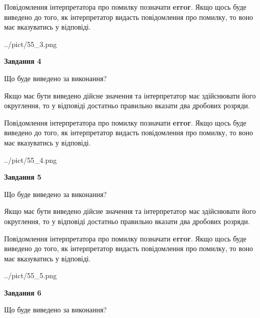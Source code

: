 \documentclass[12pt, ukrainian]{article}
\begin{document}
{\begin {Large}
Повідомлення інтерпретатора про помилку позначати \textbf{error}.
Якщо щось буде виведено до того, як інтерпретатор видасть повідомлення про помилку, 
то воно має вказуватись у відповіді. \par

\begin{center}
	{../pict/55_3.png}
\end{center}
\newpage

{\begin {center}\textbf{Завдання 4}\end {center}}\par
Що буде виведено за виконання? \par

Якщо має бути виведено дійсне значення та інтерпретатор має здійснювати його округлення, 
то у відповіді достатньо правильно вказати два дробових розряди.

Повідомлення інтерпретатора про помилку позначати \textbf{error}.
Якщо щось буде виведено до того, як інтерпретатор видасть повідомлення про помилку, 
то воно має вказуватись у відповіді. \par

\begin{center}
	{../pict/55_4.png}
\end{center}
\newpage

{\begin {center}\textbf{Завдання 5}\end {center}}\par
Що буде виведено за виконання? \par

Якщо має бути виведено дійсне значення та інтерпретатор має здійснювати його округлення, 
то у відповіді достатньо правильно вказати два дробових розряди.

Повідомлення інтерпретатора про помилку позначати \textbf{error}.
Якщо щось буде виведено до того, як інтерпретатор видасть повідомлення про помилку, 
то воно має вказуватись у відповіді. \par

\begin{center}
	{../pict/55_5.png}
\end{center}
\newpage

{\begin {center}\textbf{Завдання 6}\end {center}}\par
Що буде виведено за виконання? \par


\end{Large}}
\end{document}
